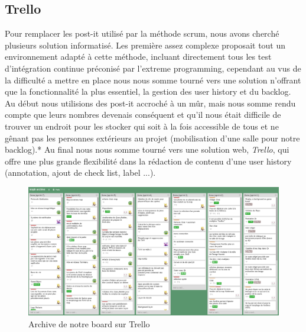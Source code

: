 \subsection{Trello}

Pour remplacer les post-it utilisé par la méthode scrum, nous avons cherché plusieurs solution informatisé.
Les première assez complexe proposait tout un environnement adapté à cette méthode, incluant directement tous les test d'intégration continue préconisé par l'extreme programming,
cependant au vus de la difficulté a mettre en place nous nous somme tourné vers une solution n'offrant que la fonctionnalité la plus essentiel, la gestion des user history et du backlog.
Au début nous utilisions des post-it accroché à un mûr, mais nous somme rendu compte que leurs nombres devenais conséquent et qu'il nous était difficile de trouver un endroit pour les stocker qui soit à la fois accessible de tous et ne gênant pas les personnes extérieurs au projet (mobilisation d'une salle pour notre backlog).*
Au final nous nous somme tourné vers une solution web, \textit{Trello}, qui offre une plus grande flexibilité dans la rédaction de contenu d'une user history (annotation, ajout de check list, label ...).

\begin{figure}[h!]
	\centering
	\includegraphics[width=1\textwidth]{img/trello_archive.png}
	\caption{Archive de notre board sur Trello}
\end{figure}
